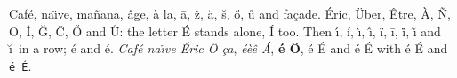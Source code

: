 \documentclass{article}
\begin{document}
Caf\'e, na\"{\i}ve, ma\~nana, \^{a}ge, \`a la, \=a, \.z, \u{a}, \v{s}, \H{o}, \r{u} and fa\c{c}ade.
\'Eric, \"Uber, \^Etre, \`A, \~N, \=O, \.I, \u{G}, \v{C}, \H{O} and \r{U}: the letter \'E stands
alone, \'I too. Then \'{\i}, \'i, \`{\i}, \^\i, \"i, \=i, \.i, \~{\i} and \u\i\ in a row; \' e and \'{e}.
\textit{Caf\'e na\"{\i}ve \'Eric \^O \c{c}a}, \textsl{\'e\`e\^e \'A}, \textbf{\'e \"O},
{\large \'e \'E} and {\footnotesize \'e \'E} with \textsf{\'e \'E} and \texttt{\'e \'E}.
\end{document}
